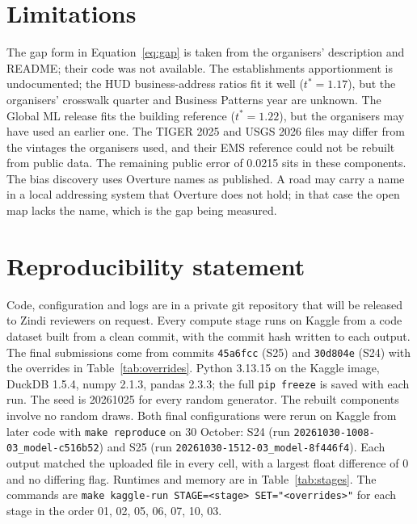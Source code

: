 \documentclass[11pt]{article}
\begin{document}
\section{Limitations}
\label{sec:limits}

The gap form in Equation~\ref{eq:gap} is taken from the organisers'
description and README; their code was not available. The establishments
apportionment is undocumented; the HUD business-address ratios fit it well
($t^\ast = 1.17$), but the organisers' crosswalk quarter and Business
Patterns year are unknown. The Global ML release fits the building reference
($t^\ast = 1.22$), but the organisers may have used an earlier one. The TIGER
2025 and USGS 2026 files may
differ from the vintages the organisers used, and their EMS reference could
not be rebuilt from public data. The remaining public error of 0.0215 sits in
these components. The bias discovery uses Overture names as
published. A road may carry a name in a local addressing system that
Overture does not hold; in that case the open map lacks the name, which is
the gap being measured.

\section*{Reproducibility statement}

Code, configuration and logs are in a private git repository that will be
released to Zindi reviewers on request. Every compute stage runs on Kaggle
from a code dataset built from a clean commit, with the commit hash written to
each output. The final submissions come from commits \texttt{45a6fcc} (S25)
and \texttt{30d804e} (S24) with the overrides in Table~\ref{tab:overrides}.
Python 3.13.15 on the Kaggle image, DuckDB 1.5.4, numpy 2.1.3, pandas 2.3.3;
the full \texttt{pip freeze} is saved with each run. The seed is 20261025 for
every random generator. The rebuilt components involve no random draws. Both
final configurations were rerun on Kaggle from later code with
\texttt{make reproduce} on 30 October: S24 (run
\texttt{20261030-1008-03\_model-c516b52}) and S25 (run
\texttt{20261030-1512-03\_model-8f446f4}). Each output matched the uploaded
file in every cell, with a largest float difference of 0 and no differing
flag. Runtimes and
memory are in Table~\ref{tab:stages}. The commands are
\texttt{make kaggle-run STAGE=<stage> SET="<overrides>"} for each stage in
the order 01, 02, 05, 06, 07, 10, 03.
\end{document}
